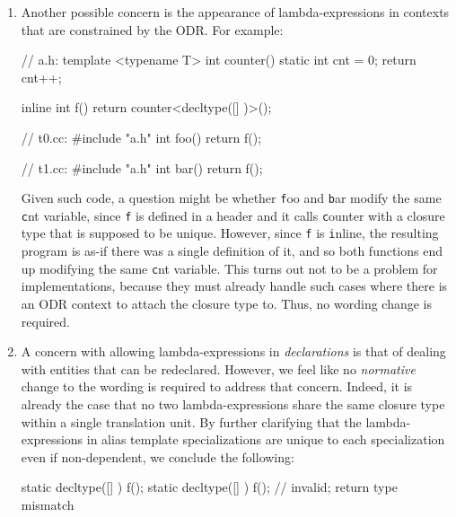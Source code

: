 \documentclass[11pt]{article}
\newcommand{\cc}[1]{\texttt{#1}}
\begin{document}
\begin{enumerate}
  Furthermore, if more clarity is desired, the following example could be added
  after \textbf{[temp.over.link] 14.5.6.1/5}:
\begin{cpp}
// The program is ill-formed, because the two lambda-expressions are
// functionally equivalent but not equivalent.
// a.cc
template <unsigned N>
void foo(const char (*s)[([]() { return N; })()]);

// b.cc
template <unsigned N>
void foo(const char (*s)[([]() { return N; })()]);
\end{cpp}


  \item Another possible concern is the appearance of lambda-expressions in
  contexts that are constrained by the ODR. For example:

\begin{cpp}
// a.h:
template <typename T>
int counter() {
  static int cnt = 0;
  return cnt++;
}

inline int f() {
  return counter<decltype([] {})>();
}

// t0.cc:
#include "a.h"
int foo() { return f(); }

// t1.cc:
#include "a.h"
int bar() { return f(); }
\end{cpp}

  Given such code, a question might be whether \cc foo and \cc bar modify
  the same \cc cnt variable, since \cc f is defined in a header and it calls
  \cc counter with a closure type that is supposed to be unique. However,
  since \cc f is \cc inline, the resulting program is as-if there was a
  single definition of it, and so both functions end up modifying the same
  \cc cnt variable. This turns out not to be a problem for implementations,
  because they must already handle such cases where there is an ODR context
  to attach the closure type to. Thus, no wording change is required.


  \item A concern with allowing lambda-expressions in \textit{declarations} is
  that of dealing with entities that can be redeclared. However, we feel like
  no \textit{normative} change to the wording is required to address that concern.
  Indeed, it is already the case that no two lambda-expressions share the same
  closure type within a single translation unit. By further clarifying that the
  lambda-expressions in alias template specializations are unique to each
  specialization even if non-dependent, we conclude the following:

\begin{cpp}
static decltype([] { }) f();
static decltype([] { }) f(); // invalid; return type mismatch


\end{cpp}
\end{enumerate}
\end{document}
